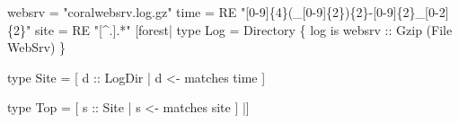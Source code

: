 \begin{code}
[pads|
  type WebSrv = ...
|]
\mbox{}
websrv = "coralwebsrv.log.gz"
time = RE "[0-9]\{4\}(_[0-9]\{2\})\{2\}-[0-9]\{2\}_[0-2]\{2\}"
site = RE "[^.].*"
\mbox{}
[forest|
  type Log = Directory 
    \{ log is websrv :: Gzip (File WebSrv) \}

  type Site = [ d :: LogDir | d <- matches time ]

  type Top = [ s :: Site | s <- matches site ]
|]
\end{code}
